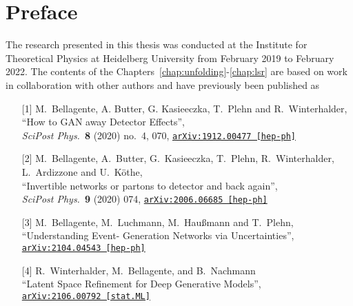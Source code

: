 %
%
%

\chapter*{Preface}

The research presented in this thesis was conducted at the Institute 
for Theoretical Physics at Heidelberg University from February 2019 to
February 2022. 
The contents of the Chapters~\ref{chap:unfolding}-\ref{chap:lsr}
are based on work in collaboration with other authors and have previously 
been published as~%
%
\begin{itemize}
	\item[{[1]}] M.~Bellagente, A. Butter, G. Kasieeczka, T.~Plehn and R.~Winterhalder,\\
			``How to GAN away Detector Effects'',\\
			\textit{SciPost Phys.}~\textbf{8} (2020) no.~4, 070, 
			\href{https://arxiv.org/abs/1912.00477}{\texttt{arXiv:1912.00477 [hep-ph]}}
	\item[{[2]}] M.~Bellagente, A.~Butter, G.~Kasieeczka, T.~Plehn, R.~Winterhalder, L.~Ardizzone and U.~Köthe,\\
			``Invertible networks or partons to detector and back again'',\\
			\textit{SciPost Phys.}~\textbf{9} (2020) 074, 
			\href{https://arxiv.org/abs/2006.06685}{\texttt{arXiv:2006.06685 [hep-ph]}}
	\item[{[3]}] M.~Bellagente,  M.~Luchmann, M.~Haußmann and T.~Plehn,\\
			``Understanding Event- Generation Networks via Uncertainties'',\\
			\href{https://arxiv.org/pdf/2104.04543.pdf}{\texttt{arXiv:2104.04543 [hep-ph]}}
	\item[{[4]}] R.~Winterhalder,  M.~Bellagente, and B.~Nachmann\\
			``Latent Space Refinement for Deep Generative Models'',\\
			\href{https://arxiv.org/pdf/2106.00792.pdf}{\texttt{arXiv:2106.00792 [stat.ML]}}
			
\end{itemize}
%



%
